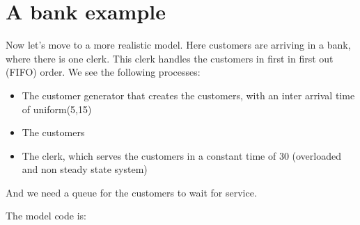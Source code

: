 \documentclass[letterpaper,10pt,english]{sphinxmanual}
\begin{document}
\section{A bank example}
\label{\detokenize{Modeling:a-bank-example}}
Now let’s move to a more realistic model. Here customers are arriving in
a bank, where there is one clerk. This clerk handles the
customers in first in first out (FIFO) order.
We see the following processes:
\begin{itemize}
\item {} 
The customer generator that creates the customers, with an inter arrival time of uniform(5,15)

\item {} 
The customers

\item {} 
The clerk, which serves the customers in a constant time of 30 (overloaded and non steady state system)

\end{itemize}

And we need a queue for the customers to wait for service.

The model code is:
\end{document}
